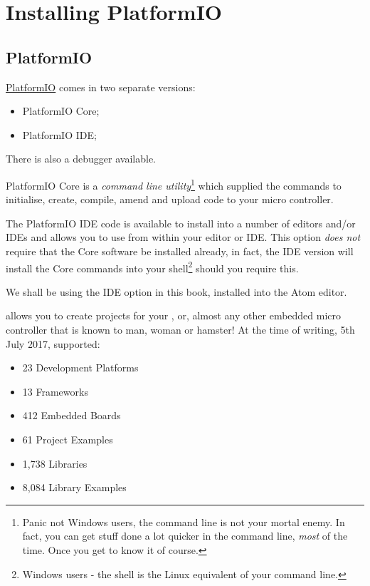 \chapter{Installing PlatformIO}\label{installing-platformio}

\section{PlatformIO}\label{platformio}

\href{http://platformio.org/}{PlatformIO} comes in two separate versions:

\begin{itemize}
	\item PlatformIO Core;
	\item PlatformIO IDE;
\end{itemize}	

There is also a debugger available. 

PlatformIO Core is a \emph{command line utility}\footnote{Panic not Windows users, the command line is not your mortal enemy. In fact, you can get stuff done a lot quicker in the command line, \emph{most} of the time. Once you get to know it of course.} which supplied the commands to initialise, create, compile, amend and upload code to your micro controller. 

The PlatformIO IDE code is available to install into a number of editors and/or IDEs and allows you to use  from within your editor or IDE. This option \emph{does not} require that the Core software be installed already, in fact, the IDE version will install the Core commands into your shell\footnote{Windows users - the shell is the Linux equivalent of your command line.} should you require this.

We shall be using the IDE option in this book, installed into the Atom editor.

 allows you to create projects for your  , or, almost any other embedded micro controller that is known to man, woman or hamster! At the time of writing, 5th July 2017,  supported:

\begin{itemize}
\item
  23 Development Platforms
\item
  13 Frameworks
\item
  412 Embedded Boards
\item
  61 Project Examples
\item
  1,738 Libraries
\item
  8,084 Library Examples
\end{itemize}

